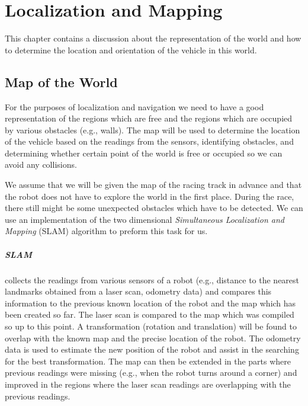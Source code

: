 \chapter{Localization and Mapping}

This chapter contains a discussion about the representation of the world and how to determine the location and orientation of the vehicle in this world.

\section{Map of the World}

For the purposes of localization and navigation we need to have a good representation of the regions which are free and the regions which are occupied by various obstacles (e.g., walls). The map will be used to determine the location of the vehicle based on the readings from the sensors, identifying obstacles, and determining whether certain point of the world is free or occupied so we can avoid any collisions.

We assume that we will be given the map of the racing track in advance and that the robot does not have to explore the world in the first place. During the race, there still might be some unexpected obstacles which have to be detected. We can use an implementation of the two dimensional \textit{Simultaneous Localization and Mapping} (SLAM) algorithm \cite{SLAM} to preform this task for us.

\paragraph{SLAM} collects the readings from various sensors of a robot (e.g., distance to the nearest landmarks obtained from a laser scan, odometry data) and compares this information to the previous known location of the robot and the map which has been created so far. The laser scan is compared to the map which was compiled so up to this point. A transformation (rotation and translation) will be found to overlap with the known map and the precise location of the robot. The odometry data is used to estimate the new position of the robot and assist in the searching for the best transformation. The map can then be extended in the parts where previous readings were missing (e.g., when the robot turns around a corner) and improved in the regions where the laser scan readings are overlapping with the previous readings.


